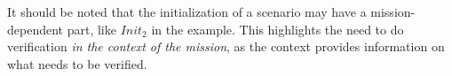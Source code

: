 It should be noted that the initialization of a scenario may have a mission-dependent part, like $Init_2$ in the example.
This highlights the need to do verification \emph{in the context of the mission}, as the context provides information on what needs to be verified.
	
%	